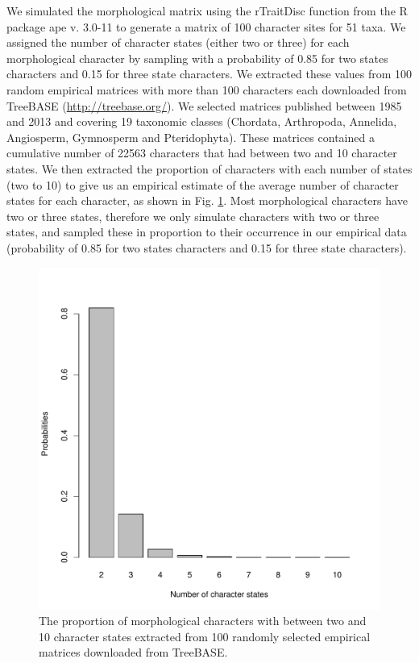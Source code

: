 We simulated the morphological matrix using the rTraitDisc function from the R package ape v. 3.0-11 \citep{paradisape:2004} to generate a matrix of 100 character sites for 51 taxa.
We assigned the number of character states (either two or three) for each morphological character by sampling with a probability of 0.85 for two states characters and 0.15 for three state characters.
We extracted these values from 100 random empirical matrices with more than 100 characters each downloaded from TreeBASE (\url{http://treebase.org/}).
We selected matrices published between 1985 and 2013 and covering 19 taxonomic classes (Chordata, Arthropoda, Annelida, Angiosperm, Gymnosperm and Pteridophyta).
These matrices contained a cumulative number of 22563 characters that had between two and 10 character states.
We then extracted the proportion of characters with each number of states (two to 10) to give us an empirical estimate of the average number of character states for each character, as shown in Fig. \ref{Fig_AppendixCharacters}.
Most morphological characters have two or three states, therefore we only simulate characters with two or three states, and sampled these in proportion to their occurrence in our empirical data (probability of 0.85 for two states characters and 0.15 for three state characters).

\begin{figure}[!htbp]
\centering
    \includegraphics[keepaspectratio=true]{TEM/Figures/TEM_Fig-AppendixCharacters.pdf}
\caption{The proportion of morphological characters with between two and 10 character states extracted from 100 randomly selected empirical matrices downloaded from TreeBASE.}
\label{Fig_AppendixCharacters}
\end{figure}

